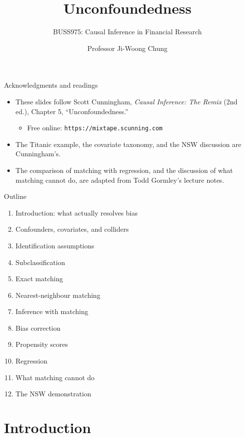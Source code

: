 \documentclass[
  11pt,
  ignorenonframetext,
  aspectratio=169,
]{beamer}
\title{\texorpdfstring{Unconfoundedness}{Unconfoundedness}}
\subtitle{\texorpdfstring{BUSS975: Causal Inference in Financial
Research}{BUSS975: Causal Inference in Financial Research}}
\author{Professor Ji-Woong Chung}
\date{}
\institute{Korea University}
\providecommand{\tightlist}{%
  \setlength{\itemsep}{0pt}\setlength{\parskip}{0pt}}
\begin{document}
\frame{\titlepage}


\begin{frame}[fragile]{Acknowledgments and readings}
\protect{}\label{acknowledgments-and-readings}
\begin{itemize}
\tightlist
\item
  These slides follow Scott Cunningham, \emph{Causal Inference: The
  Remix} (2nd ed.), Chapter 5, ``Unconfoundedness.''

  \begin{itemize}
  \tightlist
  \item
    Free online: \texttt{https://mixtape.scunning.com}
  \end{itemize}
\item
  The Titanic example, the covariate taxonomy, and the NSW discussion
  are Cunningham's.
\item
  The comparison of matching with regression, and the discussion of what
  matching cannot do, are adapted from Todd Gormley's lecture notes.
\end{itemize}
\end{frame}

\begin{frame}{Outline}
\protect{}\label{outline}
\begin{enumerate}
\tightlist
\item
  Introduction: what actually resolves bias
\item
  Confounders, covariates, and colliders
\item
  Identification assumptions
\item
  Subclassification
\item
  Exact matching
\item
  Nearest-neighbour matching
\item
  Inference with matching
\item
  Bias correction
\item
  Propensity scores
\item
  Regression
\item
  What matching cannot do
\item
  The NSW demonstration
\end{enumerate}
\end{frame}

\section{Introduction}\label{introduction}
\end{document}
